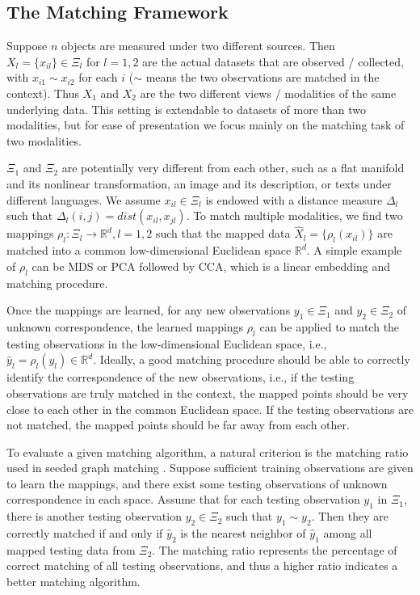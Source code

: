 \documentclass[times,twocolumn,final]{elsarticle}
\begin{document}
\subsection{The Matching Framework}
\label{bg}
Suppose $n$ objects are measured under two different sources. Then $X_{l}=\{x_{il}\} \in \Xi_{l}$ for $l=1, 2$ are the actual datasets that are observed / collected, with $x_{i1} \sim x_{i2}$ for each $i$ ($\sim$ means the two observations are matched in the context). Thus $X_{1}$ and $X_{2}$ are the two different views / modalities of the same underlying data. This setting is extendable to datasets of more than two modalities, but for ease of presentation we focus mainly on the matching task of two modalities.

$\Xi_{1}$ and $\Xi_{2}$ are potentially very different from each other, such as a flat manifold and its nonlinear transformation, an image and its description, or texts under different languages. We assume $x_{il} \in \Xi_{l}$ is endowed with a distance measure $\Delta_{l}$ such that $\Delta_{l}(i,j)=dist(x_{il},x_{jl})$. To match multiple modalities, we find two mappings $\rho_{l}: \Xi_{l} \rightarrow \mathbb{R}^{d}, l=1,2$ such that the mapped data $\hat{X}_{l}=\{ \rho_{l}(x_{il}) \}$ are matched into a common low-dimensional Euclidean space $\mathbb{R}^{d}$. A simple example of $\rho_{l}$ can be MDS or PCA followed by CCA, which is a linear embedding and matching procedure.

Once the mappings are learned, for any new observations $y_{1} \in \Xi_{1}$ and $y_{2} \in \Xi_{2}$ of unknown correspondence, the learned mappings $\rho_{l}$ can be applied to match the testing observations in the low-dimensional Euclidean space, i.e., $\hat{y}_{l} = \rho_{l}(y_{l}) \in \mathbb{R}^{d}$. Ideally, a good matching procedure should be able to correctly identify the correspondence of the new observations, i.e., if the testing observations are truly matched in the context, the mapped points should be very close to each other in the common Euclidean space. If the testing observations are not matched, the mapped points should be far away from each other.

To evaluate a given matching algorithm, a natural criterion is the matching ratio used in seeded graph matching \citep{LyzinskiFishkindPriebe2014}. Suppose sufficient training observations are given to learn the mappings, and there exist some testing observations of unknown correspondence in each space. Assume that for each testing observation $y_{1}$ in $\Xi_{1}$, there is another testing observation $y_{2} \in \Xi_{2}$ such that $y_{1} \sim y_{2}$. Then they are correctly matched if and only if $\hat{y}_{2}$ is the nearest neighbor of $\hat{y}_{1}$ among all mapped testing data from $\Xi_{2}$. The matching ratio represents the percentage of correct matching of all testing observations, and thus a higher ratio indicates a better matching algorithm. 
\end{document}
